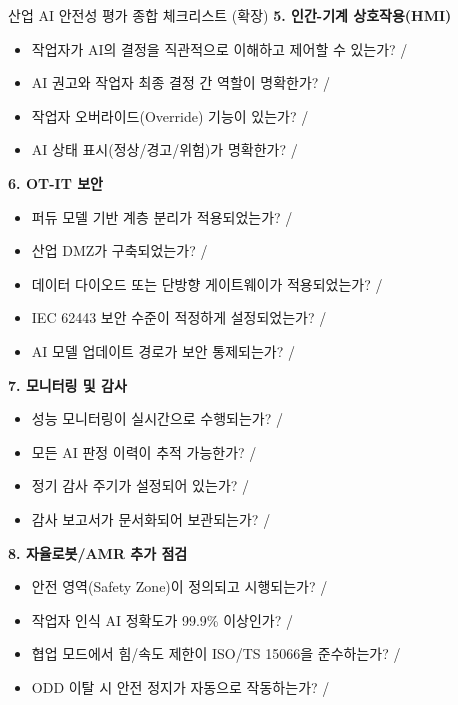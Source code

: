 \begin{practicaltool}{산업 AI 안전성 평가 종합 체크리스트 (확장)}
\textbf{5. 인간-기계 상호작용(HMI)}
\begin{itemize}
    \item 작업자가 AI의 결정을 직관적으로 이해하고 제어할 수 있는가? \checkmark / \texttimes
    \item AI 권고와 작업자 최종 결정 간 역할이 명확한가? \checkmark / \texttimes
    \item 작업자 오버라이드(Override) 기능이 있는가? \checkmark / \texttimes
    \item AI 상태 표시(정상/경고/위험)가 명확한가? \checkmark / \texttimes
\end{itemize}

\textbf{6. OT-IT 보안}
\begin{itemize}
    \item 퍼듀 모델 기반 계층 분리가 적용되었는가? \checkmark / \texttimes
    \item 산업 DMZ가 구축되었는가? \checkmark / \texttimes
    \item 데이터 다이오드 또는 단방향 게이트웨이가 적용되었는가? \checkmark / \texttimes
    \item IEC 62443 보안 수준이 적정하게 설정되었는가? \checkmark / \texttimes
    \item AI 모델 업데이트 경로가 보안 통제되는가? \checkmark / \texttimes
\end{itemize}

\textbf{7. 모니터링 및 감사}
\begin{itemize}
    \item 성능 모니터링이 실시간으로 수행되는가? \checkmark / \texttimes
    \item 모든 AI 판정 이력이 추적 가능한가? \checkmark / \texttimes
    \item 정기 감사 주기가 설정되어 있는가? \checkmark / \texttimes
    \item 감사 보고서가 문서화되어 보관되는가? \checkmark / \texttimes
\end{itemize}

\textbf{8. 자율로봇/AMR 추가 점검}
\begin{itemize}
    \item 안전 영역(Safety Zone)이 정의되고 시행되는가? \checkmark / \texttimes
    \item 작업자 인식 AI 정확도가 99.9\% 이상인가? \checkmark / \texttimes
    \item 협업 모드에서 힘/속도 제한이 ISO/TS 15066을 준수하는가? \checkmark / \texttimes
    \item ODD 이탈 시 안전 정지가 자동으로 작동하는가? \checkmark / \texttimes
\end{itemize}


\end{practicaltool}
